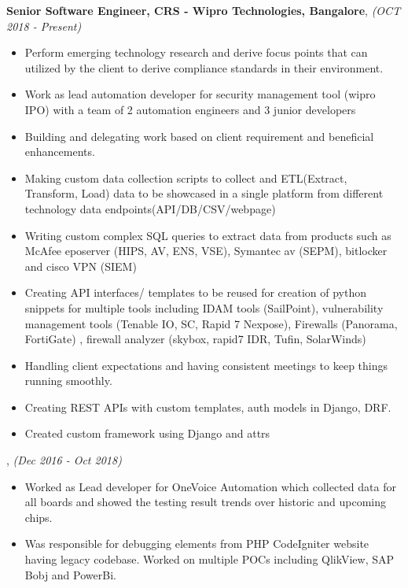 \documentclass[10pt,a4]{article}
\def\mydot{\textcolor{deep_blue}{\rule{0.75ex}{0.75ex}}}
\begin{document}
\begin{small}
{\bf Senior Software Engineer, {\color{drkgray}CRS - Wipro Technologies, Bangalore}}, {\em \color{drkgray}(OCT 2018 - Present)}
\begin{itemize}
\item[\mydot] Perform emerging technology research and derive focus points that can utilized by the client to derive compliance standards in their environment.
\item[\mydot] Work as lead automation developer for security management tool (wipro IPO) with a team of 2 automation engineers and 3 junior developers
\item[\mydot] Building and delegating work based on client requirement and beneficial enhancements.
\item[\mydot] Making custom data collection scripts to collect and ETL(Extract, Transform, Load) data to be showcased in a single platform from different technology data endpoints(API/DB/CSV/webpage)
\item[\mydot] Writing custom complex SQL queries to extract data from products such as McAfee eposerver (HIPS, AV, ENS, VSE), Symantec av (SEPM), bitlocker and cisco VPN (SIEM)
\item[\mydot] Creating API interfaces/ templates to be reused for creation of python snippets for multiple tools including IDAM tools (SailPoint), vulnerability management tools (Tenable IO, SC, Rapid 7 Nexpose), Firewalls (Panorama, FortiGate) , firewall analyzer (skybox, rapid7 IDR, Tufin, SolarWinds)
\item[\mydot] Handling client expectations and having consistent meetings to keep things running smoothly.
\item[\mydot] Creating REST APIs with custom templates, auth models in Django, DRF.
\item[\mydot] Created custom framework using Django and attrs
\end{itemize}

, {\em \color{drkgray}(Dec 2016 -  Oct 2018)}

\begin{itemize}
\item[\mydot] Worked as Lead developer for OneVoice Automation which collected data for all boards and showed the testing result trends over historic and upcoming chips.

\item[\mydot] Was responsible for debugging elements from PHP CodeIgniter website having legacy codebase. Worked on multiple POCs including QlikView, SAP Bobj and PowerBi.


\end{itemize}
\end{small}
\end{document}
